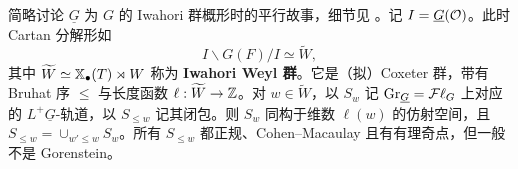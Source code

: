 \begin{rmk}
简略讨论 $\underline G$ 为 $G$ 的 Iwahori 群概形时的平行故事，细节见 \cite{Fa,PR}。记 $I=\underline G({\mathcal O})$。此时 Cartan 分解形如
\[I\backslash G(F)/I\simeq \widetilde W,\]
其中 $\widetilde W\simeq \mathbb{X}_\bullet(T)\rtimes W$ 称为 \textbf{Iwahori Weyl 群}。它是（拟）Coxeter 群，带有 Bruhat 序 $\leq$ 与长度函数 $\ell:\widetilde W\to{\mathbb Z}$。对 $w\in \widetilde{W}$，以 $S_w$ 记 ${\operatorname{Gr}}_{\underline G}={{\mathcal F}\ell}_G$ 上对应的 $L^+\underline G$-轨道，以 $S_{\leq w}$ 记其闭包。则 $S_w$ 同构于维数 $\ell(w)$ 的仿射空间，且 $S_{\leq w}=\cup_{w'\leq w}S_w$。所有 $S_{\leq w}$ 都正规、Cohen--Macaulay 且有有理奇点，但一般不是 Gorenstein。
\end{rmk}
